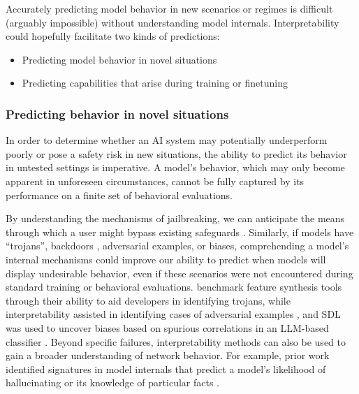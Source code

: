 Accurately predicting model behavior in new scenarios or regimes is difficult (arguably impossible) without understanding model internals. Interpretability could hopefully facilitate two kinds of predictions:
\begin{itemize}
    \item Predicting model behavior in novel situations
    \item Predicting capabilities that arise during training or finetuning
\end{itemize}

\subsubsection{Predicting behavior in novel situations}
\label{subsubsec:predicting-behavior-in-novel-situations}

In order to determine whether an AI system may potentially underperform poorly or pose a safety risk in new situations, the ability to predict its behavior in untested settings is imperative. A model's behavior, which may only become apparent in unforeseen circumstances, cannot be fully captured by its performance on a finite set of behavioral evaluations.

By understanding the mechanisms of jailbreaking, we can anticipate the means through which a user might bypass existing safeguards \citep{lee2024mechanisticunderstandingalignmentalgorithms,arditi2024refusallanguagemodelsmediated}. Similarly, if models have “trojans”, backdoors \citep{hubinger2024sleeperagentstrainingdeceptive}, adversarial examples, or biases, comprehending a model's internal mechanisms could improve our ability to predict when models will display undesirable behavior, even if these scenarios were not encountered during standard training or behavioral evaluations. \citet{casper2023redteamingdeepneural} benchmark feature synthesis tools through their ability to aid developers in identifying trojans, while interpretability assisted in identifying cases of adversarial examples 
\citep{gandelsman2024interpretingsecondordereffectsneurons, Mu_2020_Advances,Wang_2022_Circuits, Kissane_Conmy_Nanda_2024}, and SDL was used to uncover biases based on spurious correlations in an LLM-based classifier \citep{marks2024sparsefeaturecircuitsdiscovering}. Beyond specific failures, interpretability methods can also be used to gain a broader understanding of network behavior. For example, prior work identified signatures in model internals that predict a model’s likelihood of hallucinating \citep{yu2024mechanisticunderstandingmitigationlanguage} or its knowledge of particular facts \citep{gottesman2024estimatingknowledgelargelanguage}.

